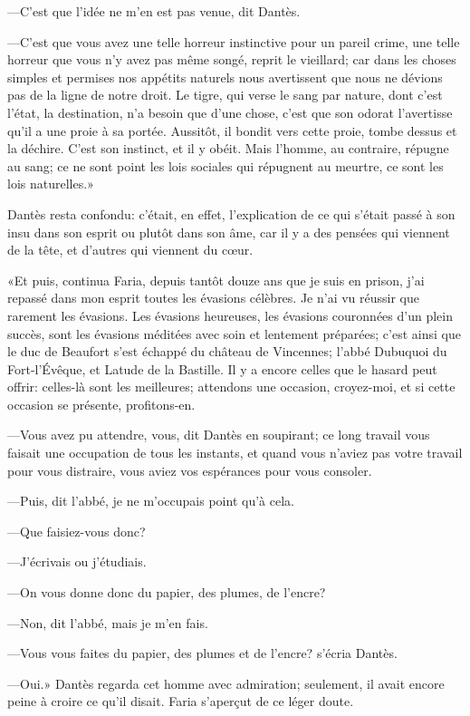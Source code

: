 —C'est que l'idée ne m'en est pas venue, dit Dantès.

—C'est que vous avez une telle horreur instinctive pour un pareil crime, une telle horreur que vous n'y avez pas même songé, reprit le vieillard; car dans les choses simples et permises nos appétits naturels nous avertissent que nous ne dévions pas de la ligne de notre droit. Le tigre, qui verse le sang par nature, dont c'est l'état, la destination, n'a besoin que d'une chose, c'est que son odorat l'avertisse qu'il a une proie à sa portée. Aussitôt, il bondit vers cette proie, tombe dessus et la déchire. C'est son instinct, et il y obéit. Mais l'homme, au contraire, répugne au sang; ce ne sont point les lois sociales qui répugnent au meurtre, ce sont les lois naturelles.»

Dantès resta confondu: c'était, en effet, l'explication de ce qui s'était passé à son insu dans son esprit ou plutôt dans son âme, car il y a des pensées qui viennent de la tête, et d'autres qui viennent du cœur.

«Et puis, continua Faria, depuis tantôt douze ans que je suis en prison, j'ai repassé dans mon esprit toutes les évasions célèbres. Je n'ai vu réussir que rarement les évasions. Les évasions heureuses, les évasions couronnées d'un plein succès, sont les évasions méditées avec soin et lentement préparées; c'est ainsi que le duc de Beaufort s'est échappé du château de Vincennes; l'abbé Dubuquoi du Fort-l'Évêque, et Latude de la Bastille. Il y a encore celles que le hasard peut offrir: celles-là sont les meilleures; attendons une occasion, croyez-moi, et si cette occasion se présente, profitons-en.

—Vous avez pu attendre, vous, dit Dantès en soupirant; ce long travail vous faisait une occupation de tous les instants, et quand vous n'aviez pas votre travail pour vous distraire, vous aviez vos espérances pour vous consoler.

—Puis, dit l'abbé, je ne m'occupais point qu'à cela.

—Que faisiez-vous donc?

—J'écrivais ou j'étudiais.

—On vous donne donc du papier, des plumes, de l'encre?

—Non, dit l'abbé, mais je m'en fais.

—Vous vous faites du papier, des plumes et de l'encre? s'écria Dantès.

—Oui.» Dantès regarda cet homme avec admiration; seulement, il avait encore peine à croire ce qu'il disait. Faria s'aperçut de ce léger doute.

